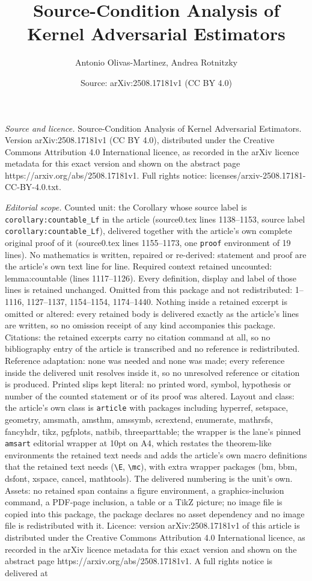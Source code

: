 \documentclass[10pt,a4paper]{amsart}
\title[Source-Condition Analysis of Kernel Adversarial Estimators]{Source-Condition Analysis of Kernel Adversarial Estimators}
\author{Antonio Olivas-Martinez, Andrea Rotnitzky}
\date{Source: arXiv:2508.17181v1 (CC BY 4.0)}
\begin{document}
\maketitle

\noindent\emph{Source and licence.} Source-Condition Analysis of Kernel Adversarial Estimators. Version arXiv:2508.17181v1 (CC BY 4.0), distributed under the Creative Commons Attribution 4.0 International licence, as recorded in the arXiv licence metadata for this exact version and shown on the abstract page https://arxiv.org/abs/2508.17181v1. Full rights notice: licenses/arxiv-2508.17181-CC-BY-4.0.txt.\par\smallskip

\noindent\textit{Editorial scope.} Counted unit: the Corollary whose source label is \texttt{corollary:countable\_Lf} in the article (source0.tex lines 1138--1153, source label \texttt{corollary:countable\_Lf}), delivered together with the article's own complete original proof of it (source0.tex lines 1155--1173, one \texttt{proof} environment of 19 lines). No mathematics is written, repaired or re-derived: statement and proof are the article's own text line for line. Required context retained uncounted: lemma:countable (lines 1117--1126). Every definition, display and label of those lines is retained unchanged. Omitted from this package and not redistributed: 1--1116, 1127--1137, 1154--1154, 1174--1440. Nothing inside a retained excerpt is omitted or altered: every retained body is delivered exactly as the article's lines are written, so no omission receipt of any kind accompanies this package. Citations: the retained excerpts carry no citation command at all, so no bibliography entry of the article is transcribed and no reference is redistributed. Reference adaptation: none was needed and none was made; every reference inside the delivered unit resolves inside it, so no unresolved reference or citation is produced. Printed slips kept literal: no printed word, symbol, hypothesis or number of the counted statement or of its proof was altered. Layout and class: the article's own class is \texttt{article} with packages including hyperref, setspace, geometry, amsmath, amsthm, amssymb, scrextend, enumerate, mathrsfs, fancyhdr, tikz, pgfplots, natbib, threeparttable; the wrapper is the lane's pinned \texttt{amsart} editorial wrapper at 10pt on A4, which restates the theorem-like environments the retained text needs and adds the article's own macro definitions that the retained text needs (\texttt{\textbackslash E}, \texttt{\textbackslash mc}), with extra wrapper packages (bm, bbm, dsfont, xspace, cancel, mathtools). The delivered numbering is the unit's own. Assets: no retained span contains a figure environment, a graphics-inclusion command, a PDF-page inclusion, a table or a TikZ picture; no image file is copied into this package, the package declares no asset dependency and no image file is redistributed with it. Licence: version arXiv:2508.17181v1 of this article is distributed under the Creative Commons Attribution 4.0 International licence, as recorded in the arXiv licence metadata for this exact version and shown on the abstract page https://arxiv.org/abs/2508.17181v1. A full rights notice is delivered at 
\end{document}
